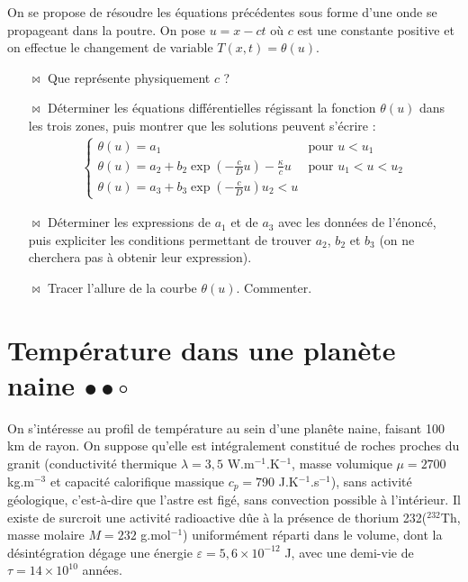\documentclass{report}
\begin{document}
On se propose de résoudre les équations précédentes sous forme d’une onde se propageant dans la poutre. On pose $u=x-ct$ où $c$ est une constante positive et on effectue le changement de variable $T(x,t)=\theta(u)$.

\begin{itemize}

	\item[$\Join$] Que représente physiquement $c$ ? 
	\item[$\Join$] Déterminer les équations différentielles régissant la fonction $\theta(u)$ dans les trois zones, puis montrer que les solutions peuvent s'écrire :
	\begin{align*}
		\left\{
    \begin{array}{ll}
        \theta(u)=a_1 & \mbox{pour } u<u_1 \\
       \theta(u)=a_2 + b_2\exp\left( -\frac{c}{D}u\right)  - \frac{\kappa}{c}u & \mbox{pour } u_1<u<u_2 \\
       \theta(u)=a_3 + b_3\exp\left( -\frac{c}{D}u\right)  u_2<u
    \end{array}
\right.
	\end{align*}
	\item[$\Join$] Déterminer les expressions de $a_1$ et de $a_3$ avec les données de l'énoncé, puis expliciter les conditions permettant de trouver $a_2$, $b_2$ et $b_3$ (on ne cherchera pas à obtenir leur expression).
	\item[$\Join$] Tracer l'allure de la courbe $\theta(u)$. Commenter. 
	
\end{itemize}

\newpage	

\section*{Température dans une planète naine $\bullet\bullet\circ$}

On s'intéresse au profil de température au sein d'une planête naine, faisant 100 km de rayon. On suppose qu'elle est intégralement constitué de roches proches du granit (conductivité thermique $\lambda = 3,5$ W.m$^{-1}$.K$^{-1}$, masse volumique $\mu=2700$ kg.m$^{-3}$ et capacité calorifique massique $c_p=790$ J.K$^{-1}$.s$^{-1}$), sans activité géologique, c'est-à-dire que l'astre est figé, sans convection possible à l'intérieur. Il existe de surcroit une activité radioactive dûe à la présence de thorium 232($^{232}$Th, masse molaire $M=232$ g.mol$^{-1}$) uniformément réparti dans le volume, dont la désintégration dégage une énergie $\varepsilon=5,6\times10^{-12}$ J, avec une demi-vie de $\tau=14\times10^{10}$ années.
\end{document}
